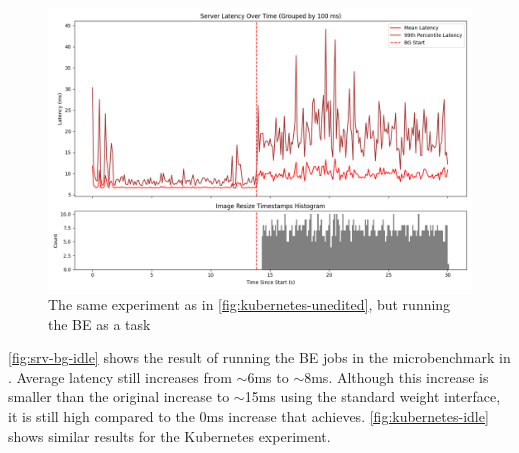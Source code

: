 \begin{figure}[t]
    \centering
    \includegraphics[width=\columnwidth]{graphs/kubernetes-idle.png}
    \caption{The same experiment as in \autoref{fig:kubernetes-unedited}, but
    running the BE as a \schedidle{} task}\label{fig:kubernetes-idle}
\end{figure}

\autoref{fig:srv-bg-idle} shows the result of running the BE jobs in the
microbenchmark in \schedidle{}. Average latency still increases from $\sim$6ms
to $\sim$8ms. Although this increase is smaller than the original increase to
$\sim$15ms using the standard weight interface, it is still high compared to the
0ms increase that \schedbe{} achieves. \autoref{fig:kubernetes-idle} shows
similar results for the Kubernetes experiment.